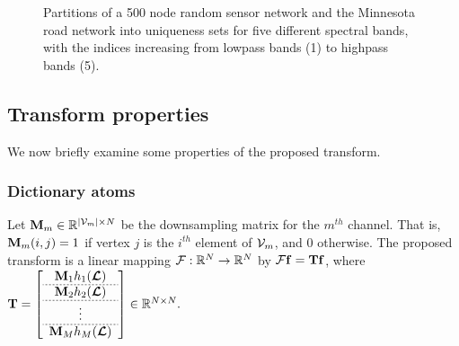 \documentclass[journal, 10pt]{IEEEtran}
\begin{document}
\begin{figure}[tb]
\begin{minipage}[m]{0.46\linewidth}
\end{minipage}
\caption{Partitions of a 500 node random sensor network and the Minnesota road network \cite{gleich} into uniqueness sets for five different spectral bands, with the indices increasing from lowpass bands (1) to highpass bands (5).} \label{Fig:part_examples}
\end{figure} 


\subsection{Transform properties}
We now briefly examine some properties of the proposed transform. 
\subsubsection{Dictionary atoms}
Let ${\bf M}_m \in \R^{|{\cal V}_m| \times N}$ be the downsampling matrix for the $m^{th}$ channel. That is, ${\bf M}_m(i,j)=1$ if vertex $j$ is the $i^{th}$ element of ${\cal V}_m$, and 0 otherwise. The proposed transform is a linear mapping ${\cal F}: \R^N \rightarrow \R^N$ by ${\cal F}{\bf f} = {\bf Tf}$, where 
$
{\bf T}=\left[
\begin{array}{c}
{\bf M}_1 h_1(\L) \\  \hdashline[.05cm/.05cm]
{\bf M}_2 h_2(\L) \\  \hdashline[.05cm/.05cm]
\vdots \\  \hdashline[.05cm/.05cm]
{\bf M}_M h_M(\L)
\end{array}
\right] \in \R^{N \times N}.
$
\end{document}
